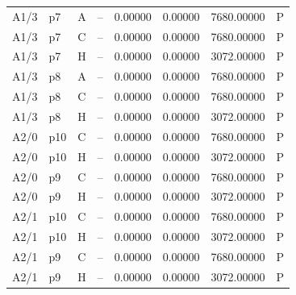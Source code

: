 \begin{longtable}{llllllll}
A1/3 & p7 & A & -- & 0.00000 & 0.00000 & 7680.00000 & P \\
A1/3 & p7 & C & -- & 0.00000 & 0.00000 & 7680.00000 & P \\
A1/3 & p7 & H & -- & 0.00000 & 0.00000 & 3072.00000 & P \\
A1/3 & p8 & A & -- & 0.00000 & 0.00000 & 7680.00000 & P \\
A1/3 & p8 & C & -- & 0.00000 & 0.00000 & 7680.00000 & P \\
A1/3 & p8 & H & -- & 0.00000 & 0.00000 & 3072.00000 & P \\
A2/0 & p10 & C & -- & 0.00000 & 0.00000 & 7680.00000 & P \\
A2/0 & p10 & H & -- & 0.00000 & 0.00000 & 3072.00000 & P \\
A2/0 & p9 & C & -- & 0.00000 & 0.00000 & 7680.00000 & P \\
A2/0 & p9 & H & -- & 0.00000 & 0.00000 & 3072.00000 & P \\
A2/1 & p10 & C & -- & 0.00000 & 0.00000 & 7680.00000 & P \\
A2/1 & p10 & H & -- & 0.00000 & 0.00000 & 3072.00000 & P \\
A2/1 & p9 & C & -- & 0.00000 & 0.00000 & 7680.00000 & P \\
A2/1 & p9 & H & -- & 0.00000 & 0.00000 & 3072.00000 & P \\
\bottomrule
\end{longtable}
\endgroup
